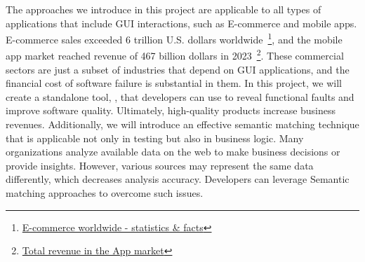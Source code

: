 \noindent
The approaches we introduce in this project are applicable to all types of applications that include GUI interactions, such as E-commerce and mobile apps.
E-commerce sales exceeded 6 trillion U.S. dollars worldwide~\footnote{\href{https://www.statista.com/topics/871/online-shopping/}{E-commerce worldwide - statistics \& facts}}, and
the mobile app market reached revenue of 467 billion dollars in 2023~\footnote{\href{https://www.statista.com/outlook/dmo/app/worldwide}{Total revenue in the App market}}.
These commercial sectors are just a subset of industries that depend on GUI applications, and the financial cost of software failure is substantial in them.
In this project, we will create a standalone tool, \rltool, that developers can use to reveal functional faults and improve software quality.
Ultimately, high-quality products increase business revenues.
%
Additionally, we will introduce an effective semantic matching technique that is applicable not only in testing but also in business logic.
Many organizations analyze available data on the web to make business decisions or provide insights. 
However, various sources may represent the same data differently, which decreases analysis accuracy. 
Developers can leverage Semantic matching approaches to overcome such issues.
